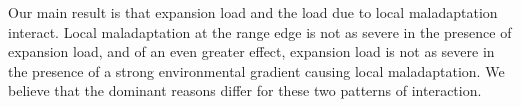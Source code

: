 

Our main result is that expansion load and the load due to local maladaptation interact. Local maladaptation at the range edge is not as severe in the presence of expansion load, and of an even greater effect, expansion load is not as severe in the presence of a strong environmental gradient causing local maladaptation. We believe that the dominant reasons differ for these two patterns of interaction. 

